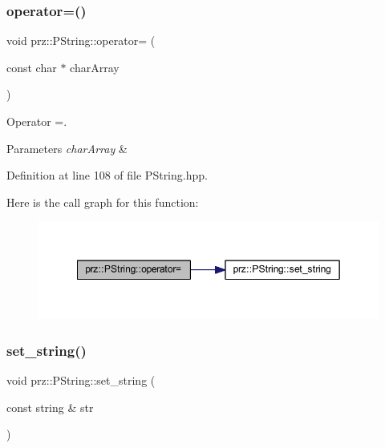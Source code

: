 \subsubsection{\texorpdfstring{operator=()}{operator=()}\hspace{0.1cm}{\footnotesize\ttfamily [3/3]}}
{\footnotesize\ttfamily void prz\+::\+P\+String\+::operator= (\begin{DoxyParamCaption}\item[{const char $\ast$}]{char\+Array }\end{DoxyParamCaption})\hspace{0.3cm}{\ttfamily [inline]}}



Operator =. 


\begin{DoxyParams}{Parameters}
{\em char\+Array} & \\
\hline
\end{DoxyParams}


Definition at line 108 of file P\+String.\+hpp.

Here is the call graph for this function\+:
\nopagebreak
\begin{figure}[H]
\begin{center}
\leavevmode
\includegraphics[width=349pt]{classprz_1_1_p_string_a01b27436f489b3e768a3c3eaa526d3b5_cgraph}
\end{center}
\end{figure}
\mbox{\label{classprz_1_1_p_string_afcef04054a81bea83bca47ea3eb2a625}} 
\subsubsection{\texorpdfstring{set\_string()}{set\_string()}}
{\footnotesize\ttfamily void prz\+::\+P\+String\+::set\+\_\+string (\begin{DoxyParamCaption}\item[{const string \&}]{str }\end{DoxyParamCaption})\hspace{0.3cm}{\ttfamily [inline]}}



